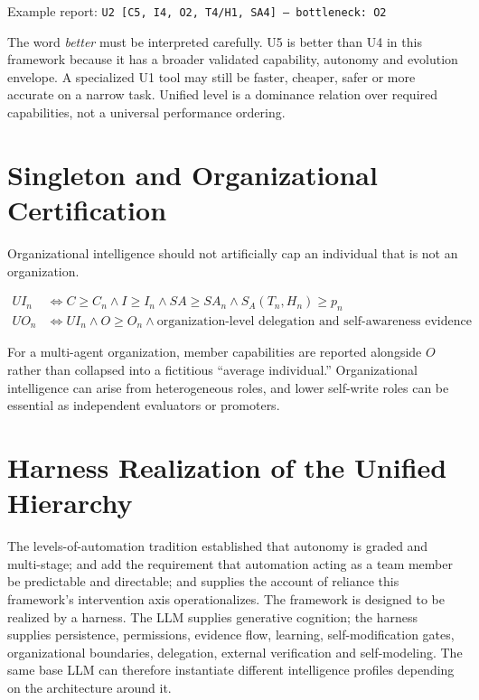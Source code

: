 \documentclass[11pt]{article}
\theoremstyle{definition}
\begin{document}
\begin{center}
Example report: \texttt{U2 [C5, I4, O2, T4/H1, SA4] --- bottleneck: O2}
\end{center}

The word \emph{better} must be interpreted carefully. U5 is better than U4 in this framework because it has a broader validated capability, autonomy and evolution envelope. A specialized U1 tool may still be faster, cheaper, safer or more accurate on a narrow task. Unified level is a dominance relation over required capabilities, not a universal performance ordering.

\section{Singleton and Organizational Certification}

Organizational intelligence should not artificially cap an individual that is not an organization.

\begin{align}
UI_n &\iff C \ge C_n \wedge I \ge I_n \wedge SA \ge SA_n \wedge S_A(T_n,H_n) \ge p_n\\
UO_n &\iff UI_n \wedge O \ge O_n \wedge \text{organization-level delegation and self-awareness evidence}
\end{align}

For a multi-agent organization, member capabilities are reported alongside $O$ rather than collapsed into a fictitious ``average individual.'' Organizational intelligence can arise from heterogeneous roles, and lower self-write roles can be essential as independent evaluators or promoters.

\section{Harness Realization of the Unified Hierarchy}

The levels-of-automation tradition \citep{sheridan1978,parasuraman2000,endsley1999} established that autonomy is graded and multi-stage; \citet{klein2004} and \citet{amershi2019} add the requirement that automation acting as a team member be predictable and directable; and \citet{lee2004} supplies the account of reliance this framework's intervention axis operationalizes. The framework is designed to be realized by a harness. The LLM supplies generative cognition; the harness supplies persistence, permissions, evidence flow, learning, self-modification gates, organizational boundaries, delegation, external verification and self-modeling. The same base LLM can therefore instantiate different intelligence profiles depending on the architecture around it.
\end{document}
